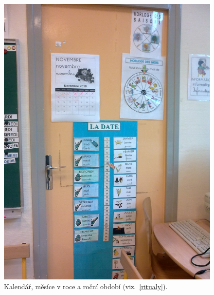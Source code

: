 	\begin{figure}[tb]
		\centering
		\includegraphics[height=0.35\textheight]{./fotky/Obr12.jpg}
		\caption{
			Kalendář, měsíce v roce a roční období (viz.~\ref{ritualy}).
		}
		\label{Obr12}
	\end{figure}

